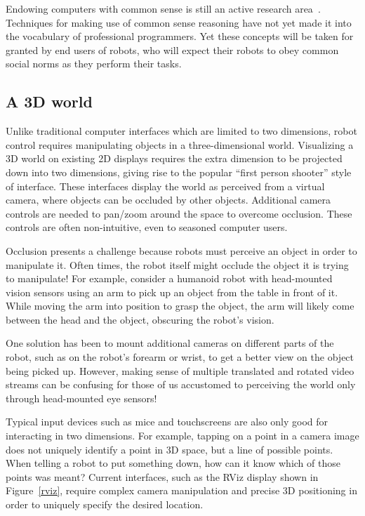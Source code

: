 \documentclass[10pt,twocolumn]{article}
\begin{document}
Endowing computers with common sense is still an active research area~\cite{mueller-cacm09}. Techniques for making use of common sense reasoning have not yet made it into the vocabulary of professional programmers. Yet these concepts will be taken for granted by end users of robots, who will expect their robots to obey common social norms as they perform their tasks.

\subsection{A 3D world}


Unlike traditional computer interfaces which are limited to two dimensions, robot control requires manipulating objects in a three-dimensional world. Visualizing a 3D world on existing 2D displays requires the extra dimension to be projected down into two dimensions, giving rise to the popular ``first person shooter'' style of interface. These interfaces display the world as perceived from a virtual camera, where objects can be occluded by other objects. Additional camera controls are needed to pan/zoom around the space to overcome occlusion. These controls are often non-intuitive, even to seasoned computer users.

Occlusion presents a challenge because robots must perceive an object in order to manipulate it.  Often times, the robot itself might occlude the object it is trying to manipulate! For example, consider a humanoid robot with head-mounted vision sensors using an arm to pick up an object from the table in front of it. While moving the arm into position to grasp the object, the arm will likely come between the head and the object, obscuring the robot's vision.

One solution has been to mount additional cameras on different parts of the robot, such as on the robot's forearm or wrist, to get a better view on the object being picked up. However, making sense of multiple translated and rotated video streams can be confusing for those of us accustomed to perceiving the world only through head-mounted eye sensors!

Typical input devices such as mice and touchscreens are also only good for interacting in two dimensions. For example, tapping on a point in a camera image does not uniquely identify a point in 3D space, but a line of possible points. When telling a robot to put something down, how can it know which of those points was meant? Current interfaces, such as the RViz display shown in Figure~\ref{rviz}, require complex camera manipulation and precise 3D positioning in order to uniquely specify the desired location.
\end{document}
